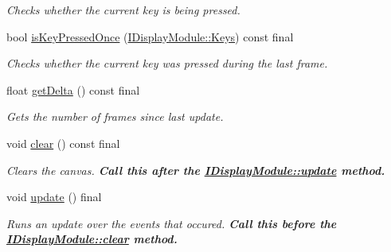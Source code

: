 \begin{DoxyCompactItemize}
\begin{DoxyCompactList}\small\item\em Checks whether the current key is being pressed. \end{DoxyCompactList}\item 
bool \mbox{\hyperlink{classArcade_1_1Display_1_1Libcaca_a2de2c9cd935fbee371fa5215bd45c137}{is\+Key\+Pressed\+Once}} (\mbox{\hyperlink{classArcade_1_1Display_1_1IDisplayModule_a8da3f6b309ca0581473ae8cc8789b619}{I\+Display\+Module\+::\+Keys}}) const final
\begin{DoxyCompactList}\small\item\em Checks whether the current key was pressed during the last frame. \end{DoxyCompactList}\item 
float \mbox{\hyperlink{classArcade_1_1Display_1_1Libcaca_a6aee007c10e66709680d1ec80f2662a4}{get\+Delta}} () const final
\begin{DoxyCompactList}\small\item\em Gets the number of frames since last update. \end{DoxyCompactList}\item 
\mbox{\label{classArcade_1_1Display_1_1Libcaca_a5ee01f197b563692077b27c21f258207}} 
void \mbox{\hyperlink{classArcade_1_1Display_1_1Libcaca_a5ee01f197b563692077b27c21f258207}{clear}} () const final
\begin{DoxyCompactList}\small\item\em Clears the canvas. {\bfseries{Call this after the \mbox{\hyperlink{classArcade_1_1Display_1_1IDisplayModule_a1ca0c1052dccb78eb470e36e6f557e60}{I\+Display\+Module\+::update}} method.}} \end{DoxyCompactList}\item 
\mbox{\label{classArcade_1_1Display_1_1Libcaca_ae34a6df0b186c523bcc423957c8d5b6d}} 
void \mbox{\hyperlink{classArcade_1_1Display_1_1Libcaca_ae34a6df0b186c523bcc423957c8d5b6d}{update}} () final
\begin{DoxyCompactList}\small\item\em Runs an update over the events that occured. {\bfseries{Call this before the \mbox{\hyperlink{classArcade_1_1Display_1_1IDisplayModule_a4892b758c6710f45d4dcebe70f801639}{I\+Display\+Module\+::clear}} method.}} \end{DoxyCompactList}\item 

\end{DoxyCompactItemize}
